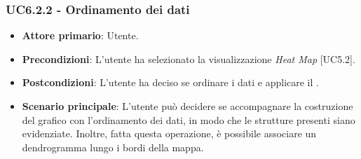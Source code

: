 \subsubsection{UC6.2.2 - Ordinamento dei dati}
\begin{itemize}
	\item \textbf{Attore primario}: Utente.
	\item \textbf{Precondizioni}: L'utente ha selezionato la visualizzazione \textit{Heat Map} [UC5.2].
	\item \textbf{Postcondizioni}: L'utente ha deciso se ordinare i dati e applicare il .
	
	\item \textbf{Scenario principale}: L'utente può decidere se accompagnare la costruzione del grafico con l’ordinamento dei dati, in modo che le strutture presenti siano evidenziate. Inoltre, fatta questa operazione, è possibile associare un dendrogramma lungo i bordi della mappa.
\end{itemize}